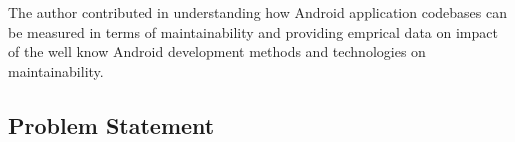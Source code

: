 The author contributed in understanding how Android application codebases can be measured in terms of maintainability and providing emprical data on impact of the well know Android development methods and technologies on maintainability. 

\subsection{Problem Statement}
\label{section:1.1}

